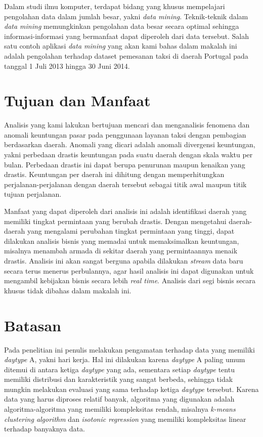 \documentclass{article}
\begin{document}
Dalam studi ilmu komputer, terdapat bidang yang khusus mempelajari pengolahan data dalam jumlah besar, yakni \textit{data mining}. Teknik-teknik dalam \textit{data mining} memungkinkan pengolahan data besar secara optimal sehingga informasi-informasi yang bermanfaat dapat diperoleh dari data tersebut. Salah satu contoh aplikasi \textit{data mining} yang akan kami bahas dalam makalah ini adalah pengolahan terhadap dataset pemesanan taksi di daerah Portugal pada tanggal 1 Juli 2013 hingga 30 Juni 2014.


\section{Tujuan dan Manfaat}

Analisis yang kami lakukan bertujuan mencari dan menganalisis fenomena dan anomali keuntungan pasar pada penggunaan layanan taksi dengan pembagian berdasarkan daerah. Anomali yang dicari adalah anomali divergensi keuntungan, yakni perbedaan drastis keuntungan pada suatu daerah dengan skala waktu per bulan. Perbedaan drastis ini dapat berupa penurunan maupun kenaikan yang drastis. Keuntungan per daerah ini dihitung dengan memperhitungkan perjalanan-perjalanan dengan daerah tersebut sebagai titik awal maupun titik tujuan perjalanan.

Manfaat yang dapat diperoleh dari analisis ini adalah identifikasi daerah yang memiliki tingkat permintaan yang berubah drastis. Dengan mengetahui daerah-daerah yang mengalami perubahan tingkat permintaan yang tinggi, dapat dilakukan analisis bisnis yang memadai untuk memaksimalkan keuntungan, misalnya menambah armada di sekitar daerah yang permintaannya menaik drastis. Analisis ini akan sangat berguna apabila dilakukan \textit{stream} data baru secara terus menerus perbulannya, agar hasil analisis ini dapat digunakan untuk mengambil kebijakan bisnis secara lebih\textit{ real time}.  Analisis dari segi bisnis secara khusus tidak dibahas dalam makalah ini.

\section{Batasan}

Pada penelitian ini penulis melakukan pengamatan terhadap data yang memiliki \textit{daytype} A, yakni hari kerja. Hal ini dilakukan karena \textit{daytype} A paling umum ditemui di antara ketiga \textit{daytype} yang ada, sementara setiap \textit{daytype} tentu memiliki distribusi dan karakteristik yang sangat berbeda, sehingga tidak mungkin melakukan evaluasi yang sama terhadap ketiga \textit{daytype} tersebut. Karena data yang harus diproses relatif banyak, algoritma yang digunakan adalah algoritma-algoritma yang memiliki kompleksitas rendah, misalnya \textit{k-means clustering algorithm} dan  \textit{isotonic regression} yang memiliki kompleksitas linear terhadap banyaknya data.
\end{document}

